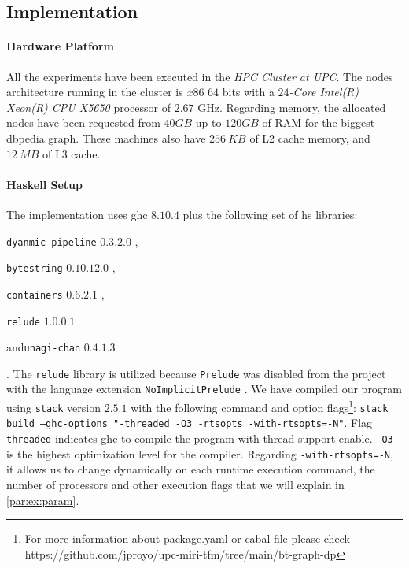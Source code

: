 \subsection{Implementation}
\paragraph{Hardware Platform} All the experiments have been executed in the \emph{HPC Cluster at UPC}. The nodes architecture running in the cluster is $x86$ $64$ bits with a \textit{$24$-Core Intel(R) Xeon(R) CPU X5650} processor of $2.67$ GHz. 
Regarding memory, the allocated nodes have been requested from $40 GB$ up to $120 GB$ of RAM for the biggest \acrshort{dbpedia} graph. These machines also have $256\ KB$ of L2 cache memory, and $12\ MB$ of L3 cache.

\paragraph{Haskell Setup} The implementation uses \acrshort{ghc} $8.10.4$ plus the following set of \acrshort{hs} libraries:
\begin{inparaenum}[]
  \item \texttt{dyanmic-pipeline} $0.3.2.0$ \cite{dynamic-pipeline},
  \item \texttt{bytestring} $0.10.12.0$ \cite{bytestring},
  \item \texttt{containers} $0.6.2.1$ \cite{containers}, 
  \item\texttt{relude} $1.0.0.1$ \cite{relude}
  \item and\texttt{unagi-chan} $0.4.1.3$ \cite{unagi} 
\end{inparaenum}. The \texttt{relude} library is utilized because \texttt{Prelude} was disabled from the project with the language extension \texttt{NoImplicitPrelude} \cite{extensions}. 
We have compiled our program using \texttt{stack} version $2.5.1$ \cite{stack} with the following command and option flags\footnote{For more information about package.yaml or cabal file please check https://github.com/jproyo/upc-miri-tfm/tree/main/bt-graph-dp}:
\texttt{stack build --ghc-options "-threaded -O3 -rtsopts -with-rtsopts=-N"}.
Flag \texttt{threaded} indicates \acrshort{ghc} to compile the program with thread support enable. \texttt{-O3} is the highest optimization level for the compiler.
Regarding \texttt{-with-rtsopts=-N}, it allows us to change dynamically on each runtime execution command, the number of processors and other execution flags that we will explain in \autoref{par:ex:param}. 

